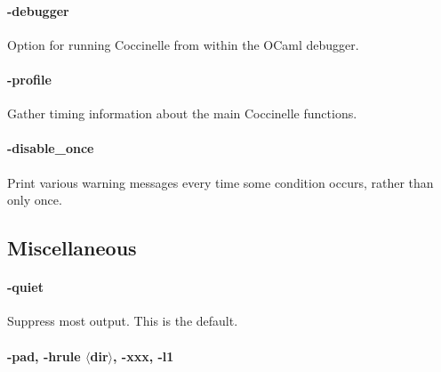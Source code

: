 \documentclass{article}
\newcommand{\rare}[2]{\paragraph*{\makebox[0in][r]{\BigDiamondshape\,\,} {{#1}}} {#2}}
\newcommand{\developer}[2]{\paragraph*{{#1}} {#2}}
\begin{document}
\developer{-debugger}{Option for running Coccinelle from within the OCaml
  debugger.}

\developer{-profile}{ Gather timing information about the main Coccinelle
functions.}

\developer{-disable\_once}{Print various warning messages every time some
condition occurs, rather than only once.}

\subsection{Miscellaneous}

\rare{-quiet}{Suppress most output.  This is the default.}

\developer{-pad, -hrule $\langle$dir$\rangle$, -xxx, -l1}{}
\end{document}
